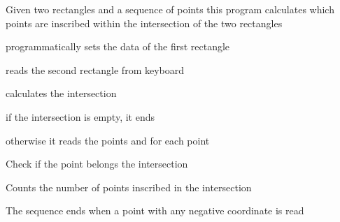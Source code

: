 Given two rectangles and a sequence of points this program calculates which points are inscribed within the intersection of the two rectangles
\begin{DoxyItemize}
\item programmatically sets the data of the first rectangle
\item reads the second rectangle from keyboard
\item calculates the intersection
\begin{DoxyItemize}
\item if the intersection is empty, it ends
\item otherwise it reads the points and for each point
\begin{DoxyItemize}
\item Check if the point belongs the intersection
\item Counts the number of points inscribed in the intersection
\item The sequence ends when a point with any negative coordinate is read 
\end{DoxyItemize}
\end{DoxyItemize}
\end{DoxyItemize}
